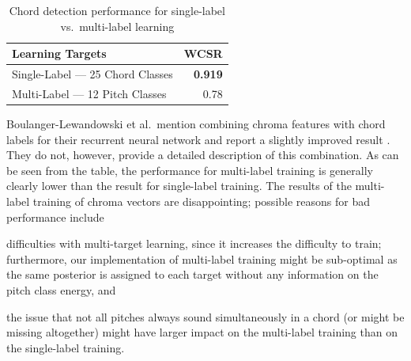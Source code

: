 \documentclass{article}
\begin{document}
\begin{table}
\centering
\begin{tabular*}{\columnwidth}{@{\extracolsep{\fill}}lr}
\toprule
\textbf{Learning Targets} & \textbf{WCSR}  \\ \midrule
Single-Label --- 25 Chord Classes & \textbf{0.919} \\
Multi-Label --- 12 Pitch Classes & 0.78  \\ \bottomrule
\end{tabular*}
\caption{Chord detection performance for single-label vs.\ multi-label learning}
\label{tab:multilabel}
\end{table}
Boulanger-Lewandowski et al.\ mention combining chroma features with chord labels for their recurrent neural network and report a slightly improved result \cite{boulanger2013audio}. They do not, however, provide a detailed description of this combination. 
As can be seen from the table, the performance for multi-label training is generally clearly lower than the result for single-label training.
The results of the multi-label training of chroma vectors are disappointing; possible reasons for bad performance include
\begin{inparaenum}[(i)]
    \item   difficulties with multi-target learning, since it increases the difficulty to train; furthermore, our implementation of multi-label training might be sub-optimal as the same posterior is assigned to each target without any information on the pitch class energy, and
    \item   the issue that not all pitches always sound simultaneously in a chord (or might be missing altogether) might have larger impact on the multi-label training than on the single-label training.    
\end{inparaenum}
\end{document}

